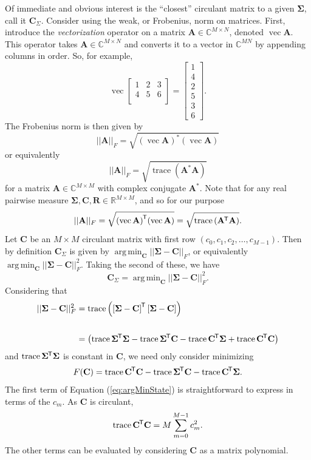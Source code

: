 \documentclass[letterpaper,12pt,oneside,final]{article}
\newcommand{\m}[1]{\mathbf{#1}}               %
\newcommand{\sm}[1]{\boldsymbol{#1}}   %
\newcommand{\tr}[1]{{#1}^{\mkern-1.5mu\mathsf{T}}}              %
\newcommand{\conj}[1]{{#1}^{\ast}}
\newcommand{\norm}[1]{||{#1}||}              %
\newcommand{\frob}[1]{\norm{#1}_F}
\newcommand*{\mvec}{\operatorname{vec}}
\newcommand*{\trace}{\operatorname{trace}}
\DeclareMathOperator*{\argmin}{arg\,min}
\newcommand{\field}[1]{\mathbb{#1}}
\newcommand{\Reals}{\field{R}}
\newcommand{\Complex}{\field{C}}
\begin{document}
Of immediate and obvious interest is the ``closest'' circulant matrix to a given $\sm{\Sigma}$, call it $\m{C}_{\Sigma}$. Consider using the weak, or Frobenius, norm on matrices. First, introduce the \textit{vectorization} operator on a matrix $\m{A} \in \Complex^{M \times N}$, denoted $\mvec{\m{A}}$. This operator takes $\m{A} \in \Complex^{M \times N}$ and converts it to a vector in $\Complex^{MN}$ by appending columns in order. So, for example,
$$\mvec{\begin{bmatrix}
    1 & 2 & 3 \\
    4 & 5 & 6 \\
  \end{bmatrix}} =
\begin{bmatrix}
  1 \\ 4 \\ 2 \\ 5 \\ 3 \\ 6
  \end{bmatrix}.$$
The Frobenius norm is then given by
$$\frob{\m{A}} = \sqrt{\conj{(\mvec{\m{A}})} (\mvec{\m{A}})}$$
or equivalently
$$\frob{\m{A}} = \sqrt{\trace \left ( \conj{\m{A}} \m{A} \right )}$$
for a matrix $\m{A} \in \Complex^{M \times M}$ with complex conjugate $\conj{\m{A}}$. Note that for any real pairwise measure $\sm{\Sigma}, \m{C}, \m{R} \in \Reals^{M \times M}$, and so for our purpose
$$\frob{\m{A}} = \sqrt{\tr{(\mvec{\m{A}})} (\mvec{\m{A}})} = \sqrt{ \trace \left ( \tr{\m{A}} \m{A} \right )}.$$
Let $\m{C}$ be an $M \times M$ circulant matrix with first row $( c_0, c_1, c_2, \dots, c_{M-1} )$. Then by definition $\m{C}_{\Sigma}$ is given by $\argmin_{\m{C}} \frob{\sm{\Sigma} - \m{C}}$, or equivalently $\argmin_{\m{C}} \frob{\sm{\Sigma} - \m{C}}^2$. Taking the second of these, we have
\begin{equation} \label{eq:argMinDef}
  \m{C}_{\Sigma} = \argmin_{\m{C}} \frob{\sm{\Sigma} - \m{C}}^2.
\end{equation}
Considering that
\begin{equation*}
  \begin{split}
    \frob{\sm{\Sigma} - \m{C}}^2 & = \trace \left ( \tr{\left [ \sm{\Sigma} - \m{C} \right ]} \left [ \sm{\Sigma} - \m{C} \right ] \right ) \\
    & \\
    & = \left ( \trace \tr{\sm{\Sigma}} \sm{\Sigma} - \trace \tr{\sm{\Sigma}} \m{C} - \trace \tr{\m{C}} \sm{\Sigma} + \trace \tr{\m{C}} \m{C} \right )
  \end{split}
\end{equation*}
and $\trace \tr{\sm{\Sigma}} \sm{\Sigma}$ is constant in $\m{C}$, we need only consider minimizing
\begin{equation} \label{eq:argMinState}
  F(\m{C}) = \trace \tr{\m{C}} \m{C} - \trace \tr{\sm{\Sigma}} \m{C} - \trace \tr{\m{C}} \sm{\Sigma}.
\end{equation}
The first term of Equation (\ref{eq:argMinState}) is straightforward to express in terms of the $c_m$. As $\m{C}$ is circulant,
$$\trace \tr{\m{C}} \m{C} = M \sum_{m = 0}^{M-1} c_m^2.$$
The other terms can be evaluated by considering $\m{C}$ as a matrix polynomial.
\end{document}
